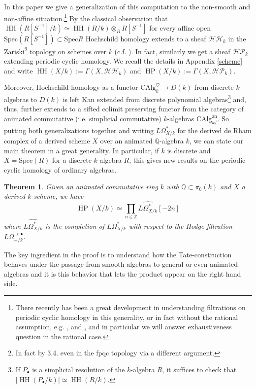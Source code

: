 \documentclass[10pt, reqno]{amsart}
\newtheorem{theorem}{Theorem}[section]
\theoremstyle{definition}
\theoremstyle{remark}
\newcommand{\Q}{\mathbb{Q}}
\newcommand{\Z}{\mathbb{Z}}
\newcommand{\CAlg}{\mathrm{CAlg}}
\newcommand{\dr}[3]{\Omega^{#3}_{#1/#2}}
\newcommand{\Spec}{\mathrm{Spec}}
\newcommand{\an}{\mathrm{an}}
\newcommand{\shvHH}{\mathcal{HH}}
\newcommand{\shvHP}{\mathcal{HP}}
\DeclareMathOperator{\HH}{\mathrm{HH}}
\DeclareMathOperator{\HP}{\mathrm{HP}}
\begin{document}
In this paper we give a generalization of this computation to the non-smooth and non-affine situation.\footnote{There recently has been a great development in understanding filtrations on periodic cyclic homology in this generality, or in fact without the rational assumption, e.g. \cite{Ant19}, \cite{Rak20} and \cite{MRT22}, and in particular we will answer exhaustiveness question in the rational case.}
By the classical observation that $\HH(R[S^{-1}]/k)\simeq\HH(R/k)\otimes_RR[S^{-1}]$ for every affine open $\Spec(R[S^{-1}])\subset\Spec R$ Hochschild homology extends to a sheaf $\shvHH_k$ in the Zariski\footnote{In fact by \cite{BMS19} 3.4. even in the fpqc topology via a different argument.} topology on schemes over $k$ (c.f. \cite{GW91}). In fact, similarly we get a sheaf $\shvHP_k$ extending periodic cyclic homology. We recall the details in Appendix \ref{scheme} and write $\HH(X/k):=\Gamma(X,\shvHH_k)$ and $\HP(X/k):=\Gamma(X,\shvHP_k)$.

Moreover, Hochschild homology as a functor $\CAlg_k^\heartsuit\to D(k)$ from discrete $k$-algebras to $D(k)$ is left Kan extended from discrete polynomial algebras\footnote{If $P_\bullet$ is a simplicial resolution of the $k$-algebra $R$, it suffices to check that $|\HH(P_\bullet/k)|\simeq \HH(R/k)$.} and, thus, further extends to a sifted colimit preserving functor from the category of animated commutative (i.e. simplicial commutative) $k$-algebras $\CAlg^\an_{k/}$. So putting both generalizations together and writing $L\dr Xk*$ for the derived de Rham complex of a derived scheme $X$ over an animated $\Q$-algebra $k$, we can state our main theorem in a great generality. In particular, if $k$ is discrete and $X=\Spec(R)$ for a discrete $k$-algebra $R$, this gives new results on the periodic cyclic homology of ordinary algebras.

\begin{theorem}\label{maintheo}
	Given an animated commutative ring $k$ with $\Q\subset\pi_0(k)$ and $X$ a derived $k$-scheme, we have
	\[\HP(X/k)\simeq \prod_{n\in\Z}\widehat{L\dr Xk*}[-2n]\]
	where $\widehat{L\dr Xk*}$ is the completion of $L\dr Xk*$ with respect to the Hodge filtration $L\dr -k{\geq\bullet}$.
\end{theorem}

The key ingredient in the proof is to understand how the Tate-construction behaves under the passage from smooth algebras to general or even animated algebras and it is this behavior that lets the product appear on the right hand side.
\end{document}
